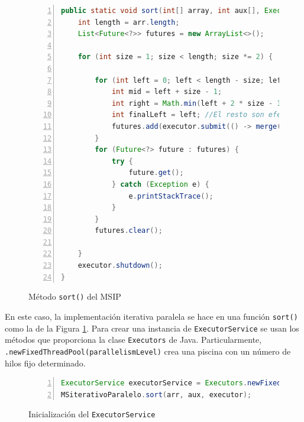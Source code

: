 \documentclass[titlepage]{article}
\begin{document}
\begin{figure}[h]
	\centering
	\begin{lstlisting}[language=java, frame=single, numbers=left]
public static void sort(int[] array, int aux[], ExecutorService executor) {
	int length = arr.length;
	List<Future<?>> futures = new ArrayList<>();
	
	for (int size = 1; size < length; size *= 2) {
		
		for (int left = 0; left < length - size; left += 2 * size) {
			int mid = left + size - 1;
			int right = Math.min(left + 2 * size - 1, length - 1);
			int finalLeft = left; //El resto son efectivamente finales
			futures.add(executor.submit(() -> merge(arr, aux, finalLeft, mid, right)));
		}
		for (Future<?> future : futures) {
			try {
				future.get();
			} catch (Exception e) {
				e.printStackTrace();
			}
		}
		futures.clear();
		
	}
	executor.shutdown();
}
	\end{lstlisting}
	
	\caption{Método \lstinline{sort()} del MSIP}
	\label{fig:MSIP_sort()}
\end{figure}

En este caso, la implementación iterativa paralela se hace en una función \lstinline{sort() } como la de la Figura \ref{fig:MSIP_sort()}. Para crear una instancia de \lstinline{ExecutorService} se usan los métodos que proporciona la clase \lstinline{Executors} de Java. Particularmente, \lstinline{.newFixedThreadPool(parallelismLevel)} crea una piscina con un número de hilos fijo determinado. 

\begin{figure}[h]
	\begin{lstlisting}[language=java, frame=single, numbers=left]
ExecutorService executorService = Executors.newFixedThreadPool(parallelismLevel);
MSiterativoParalelo.sort(arr, aux, executor);
	\end{lstlisting}
	\caption{Inicialización del \lstinline{ExecutorService}}
	\label{fig:creacionExecutorService}
\end{figure}
\end{document}
